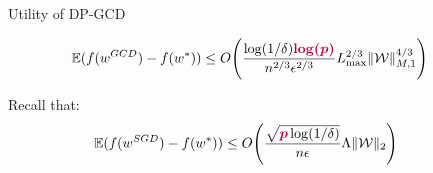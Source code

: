 \documentclass[17pt,aspectratio=169]{beamer}
\begin{document}
\begin{frame}{Utility of DP-GCD}

  \vspace{-1em}

  \begin{align*}
    \!\!\!
    \mathbb E(f(w^{GCD}) - f(w^*))
    & \le
      O \Bigg(
      \frac{\log(1/\delta)\boldsymbol{\textcolor{purple}{\log(p)}}}{n^{2/3}\epsilon^{2/3}}
      L_{\max}^{2/3} \| \mathcal W \|_{M,1}^{4/3}
      \Bigg)
  \end{align*}

  \vspace{1em}

  Recall that:
  \begin{align*}
    \mathbb E ( f(w^{SGD}) - f(w^*) )
    & \le
      O\Bigg(
      \frac{\sqrt{\boldsymbol{\textcolor{purple}{p}}\log(1/\delta)}}{n \epsilon} \Lambda \| \mathcal W \|_2
      \Bigg)
    &&
  \end{align*}

\end{frame}
\end{document}
